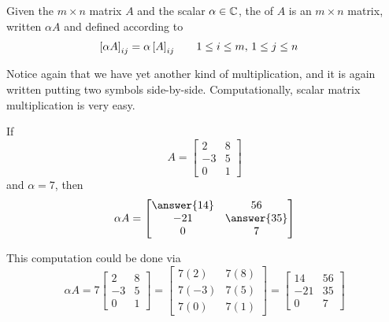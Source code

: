 \documentclass{ximera}
\begin{document}
\begin{definition}
Given the $m\times n$ matrix $A$
and the scalar $\alpha\in\mathbb{C}$, the  of $A$ is an $m\times n$ matrix, written $\alpha A$ and defined according to
\begin{align*}
\left\lbrack\alpha A\right\rbrack_{ij}&=\alpha\left\lbrack A\right\rbrack_{ij}&&
\quad 1\leq i\leq m,\,1\leq j\leq n
\end{align*}
\end{definition}

Notice again that we have yet another kind of multiplication, and it is again written putting two symbols side-by-side.  Computationally, scalar matrix multiplication is very easy.

\begin{example}
  If
  \[
    A=
    \begin{bmatrix}
      2&8\\
      -3&5\\0&1
    \end{bmatrix}
  \]
  and $\alpha=7$, then
    \[
      \alpha A=
      \begin{bmatrix}\answer{14}&56\\-21&\answer{35}\\0&7\end{bmatrix}
    \]
    \begin{hint}
      This computation could be done via
      \[
        \alpha A=
        7\begin{bmatrix}2&8\\-3&5\\0&1\end{bmatrix}=
        \begin{bmatrix}7(2)&7(8)\\7(-3)&7(5)\\7(0)&7(1)\end{bmatrix}=
        \begin{bmatrix}14&56\\-21&35\\0&7\end{bmatrix}
      \]
    \end{hint}
\end{example}
\end{document}
